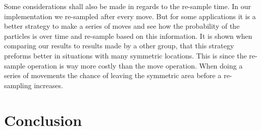 Some considerations shall also be made in regards to the re-sample time. In our implementation we re-sampled after every move. But for some applications it is a better strategy to make a series of moves and see how the probability of the particles is over time and re-sample based on this information. It is shown when comparing our results to results made by a other group, that this strategy preforms better in situations with many symmetric locations. This is since the re-sample operation is way more costly than the move operation. When doing a series of movements the chance of leaving the symmetric area before a re-sampling increases. 


\chapter{Conclusion}
